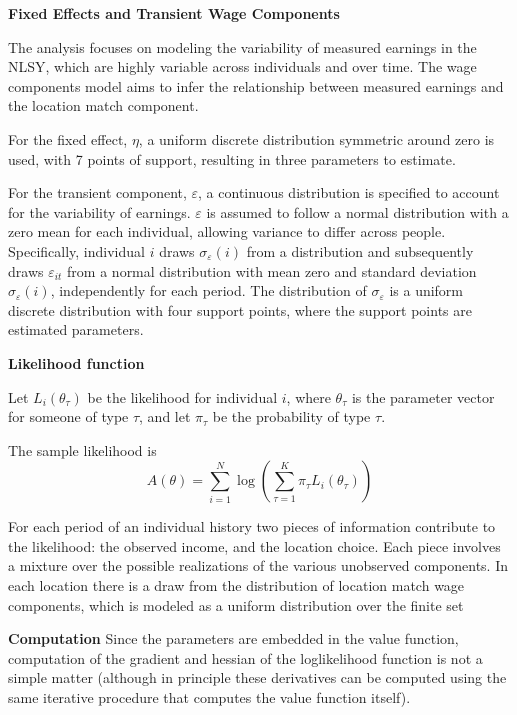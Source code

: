 \documentclass{article}
\numberwithin{equation}{section} %
\begin{document}
\textbf{Fixed Effects and Transient Wage Components}

The analysis focuses on modeling the variability of measured earnings in the NLSY, which are highly variable across individuals and over time. The wage components model aims to infer the relationship between measured earnings and the location match component. 

For the fixed effect, $\eta$, a uniform discrete distribution symmetric around zero is used, with 7 points of support, resulting in three parameters to estimate. 

For the transient component, $\varepsilon$, a continuous distribution is specified to account for the variability of earnings. $\varepsilon$ is assumed to follow a normal distribution with a zero mean for each individual, allowing variance to differ across people. Specifically, individual $i$ draws $\sigma_{\varepsilon}(i)$ from a distribution and subsequently draws $\varepsilon_{it}$ from a normal distribution with mean zero and standard deviation $\sigma_{\varepsilon}(i)$, independently for each period. The distribution of $\sigma_{\varepsilon}$ is a uniform discrete distribution with four support points, where the support points are estimated parameters.

\textbf{Likelihood function}

Let $L_i(\theta_\tau)$ be the likelihood for individual $i$, where $\theta_\tau$ is the parameter vector for someone of type $\tau$, and let $\pi_\tau$ be the probability of type $\tau$.

The sample likelihood is 
\begin{equation}
  A(\theta)=\sum\limits_{i=1}^{N}\log(\sum\limits_{\tau=1}^{K}\pi_\tau L_i(\theta_\tau))
\end{equation}

For each period of an individual history two pieces of information contribute to the  likelihood: the observed income, and the location choice. Each piece involves a mixture over the  possible realizations of the various unobserved components. In each location there is a draw  from the distribution of location match wage components, which is modeled as a uniform distribution over the finite set 



\textbf{Computation}
Since the parameters are embedded in the value function, computation of the gradient and hessian of the loglikelihood function is not a simple matter (although in principle these  derivatives can be computed using the same iterative procedure that computes the value  function itself). 
\end{document}
